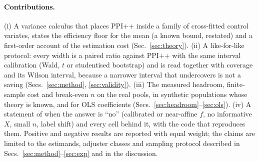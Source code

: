 \paragraph{Contributions.}
(i) A variance calculus that places PPI++ inside a family of cross-fitted control variates, states the efficiency floor for the mean (a known bound, restated) and a first-order account of the estimation cost (Sec.~\ref{sec:theory}).
(ii) A like-for-like protocol: every width is a paired ratio against PPI++ with the same interval calibration (Wald, $t$ or studentised bootstrap) and is read together with coverage and its Wilson interval, because a narrower interval that undercovers is not a saving (Secs.~\ref{sec:method}, \ref{sec:validity}).
(iii) The measured headroom, finite-sample cost and break-even $n$ on the real pools, in synthetic populations whose theory is known, and for OLS coefficients (Secs.~\ref{sec:headroom}--\ref{sec:ols}).
(iv) A statement of when the answer is ``no'' (calibrated or near-affine $f$, no informative $X$, small $n$, label shift) and every cell behind it, with the code that reproduces them.
Positive and negative results are reported with equal weight; the claims are limited to the estimands, adjuster classes and sampling protocol described in Secs.~\ref{sec:method}--\ref{sec:exp} and in the discussion.
